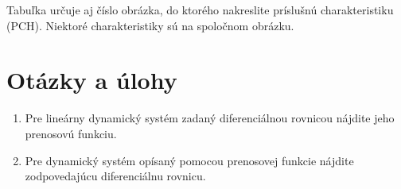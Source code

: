 \documentclass[a4paper, 10pt, ]{article}
\begin{document}
\medskip

\noindent
Tabuľka určuje aj číslo obrázka, do ktorého nakreslite príslušnú charakteristiku (PCH). Niektoré charakteristiky sú na spoločnom obrázku.














\section{Otázky a úlohy}

\begin{enumerate}[leftmargin=0pt, labelsep=3mm, itemsep=0pt]


    \item Pre lineárny dynamický systém zadaný diferenciálnou rovnicou nájdite jeho prenosovú funkciu.

	\item Pre dynamický systém opísaný pomocou prenosovej funkcie nájdite zodpovedajúcu diferenciálnu rovnicu.

\end{enumerate}







{}
% 

\end{document}
